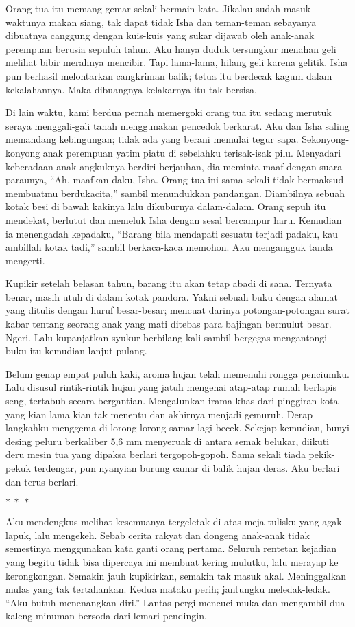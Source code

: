 \documentclass[smalldemyvopaper,11pt,twoside,onecolumn,openright,extrafontsizes]{memoir}
\newcommand\separator{
  \begin{center}
    \(\ast~\ast~\ast\)
  \end{center}
}
\begin{document}
Orang tua itu memang gemar sekali bermain kata. Jikalau sudah masuk waktunya makan siang, tak dapat tidak Isha dan teman-teman sebayanya dibuatnya canggung dengan kuis-kuis yang sukar dijawab oleh anak-anak perempuan berusia sepuluh tahun. Aku hanya duduk tersungkur menahan geli melihat bibir merahnya mencibir. Tapi lama-lama, hilang geli karena gelitik. Isha pun berhasil melontarkan cangkriman balik; tetua itu berdecak kagum dalam kekalahannya. Maka dibuangnya kelakarnya itu tak bersisa.

Di lain waktu, kami berdua pernah memergoki orang tua itu sedang merutuk seraya menggali-gali tanah menggunakan pencedok berkarat. Aku dan Isha saling memandang kebingungan; tidak ada yang berani memulai tegur sapa. Sekonyong-konyong anak perempuan yatim piatu di sebelahku terisak-isak pilu. Menyadari keberadaan anak angkuknya berdiri berjauhan, dia meminta maaf dengan suara paraunya, ``Ah, maafkan daku, Isha. Orang tua ini sama sekali tidak bermaksud membuatmu berdukacita,'' sambil menundukkan pandangan. Diambilnya sebuah kotak besi di bawah kakinya lalu dikuburnya dalam-dalam. Orang sepuh itu mendekat, berlutut dan memeluk Isha dengan sesal bercampur haru. Kemudian ia menengadah kepadaku, ``Barang bila mendapati sesuatu terjadi padaku, kau ambillah kotak tadi,'' sambil berkaca-kaca memohon. Aku mengangguk tanda mengerti.

Kupikir setelah belasan tahun, barang itu akan tetap abadi di sana. Ternyata benar, masih utuh di dalam kotak pandora. Yakni sebuah buku dengan alamat yang ditulis dengan huruf besar-besar; mencuat darinya potongan-potongan surat kabar tentang seorang anak yang mati ditebas para bajingan bermulut besar. Ngeri. Lalu kupanjatkan syukur berbilang kali sambil bergegas mengantongi buku itu kemudian lanjut pulang.

Belum genap empat puluh kaki, aroma hujan telah memenuhi rongga penciumku. Lalu disusul rintik-rintik hujan yang jatuh mengenai atap-atap rumah berlapis seng, tertabuh secara bergantian. Mengalunkan irama khas dari pinggiran kota yang kian lama kian tak menentu dan akhirnya menjadi gemuruh. Derap langkahku menggema di lorong-lorong samar lagi becek. Sekejap kemudian, bunyi desing peluru berkaliber 5,6 mm menyeruak di antara semak belukar, diikuti deru mesin tua yang dipaksa berlari tergopoh-gopoh. Sama sekali tiada pekik-pekuk terdengar, pun nyanyian burung camar di balik hujan deras. Aku berlari dan terus berlari.

\separator{}

\noindent Aku mendengkus melihat kesemuanya tergeletak di atas meja tulisku yang agak lapuk, lalu mengekeh. Sebab cerita rakyat dan dongeng anak-anak tidak semestinya menggunakan kata ganti orang pertama. Seluruh rentetan kejadian yang begitu tidak bisa dipercaya ini membuat kering mulutku, lalu merayap ke kerongkongan. Semakin jauh kupikirkan, semakin tak masuk akal. Meninggalkan mulas yang tak tertahankan. Kedua mataku perih; jantungku meledak-ledak. ``Aku butuh menenangkan diri.'' Lantas pergi mencuci muka dan mengambil dua kaleng minuman bersoda dari lemari pendingin.
\end{document}
